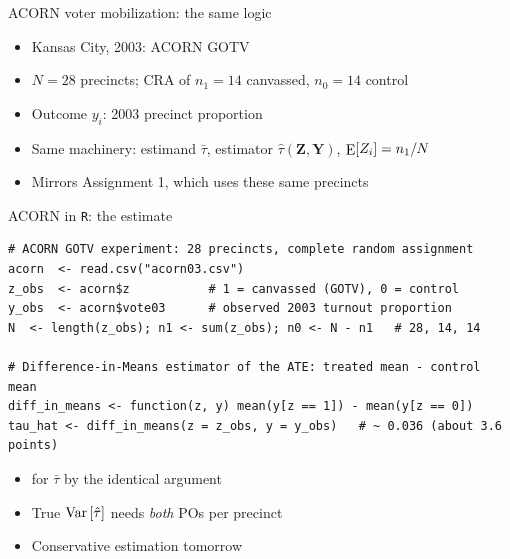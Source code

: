 \documentclass[table, xcolor = {dvipsnames}, 9pt]{beamer}
\theoremstyle{plain}
\newcommand{\mh}[1]{{\color{magenta}{#1}}}
\DeclareMathOperator{\E}{\rm{E}}
\DeclareMathOperator{\Var}{\rm{Var}}
\begin{document}
\begin{frame}[t]{ACORN voter mobilization: the same logic}
\vfill
\begin{itemize} \vfill
\item Kansas City, 2003: ACORN \mh{door-to-door} GOTV \citep{arceneaux2005} \vfill
\item $N = 28$ precincts; CRA of $n_1 = 14$ canvassed, $n_0 = 14$ control \vfill
\item Outcome $y_i$: 2003 precinct \mh{turnout} proportion \vfill
\item Same machinery: estimand $\bar{\tau}$, estimator $\hat{\tau}\left(\bm{Z}, \bm{Y}\right)$, $\E[Z_i] = n_1/N$ \vfill
\item Mirrors Assignment 1, which uses these same precincts \vfill
\end{itemize} \vfill
\end{frame}
\begin{frame}[fragile]{ACORN in \texttt{R}: the estimate}
\begin{lstlisting}[style=Rstyle, basicstyle=\ttfamily\tiny, frame=single]
# ACORN GOTV experiment: 28 precincts, complete random assignment
acorn  <- read.csv("acorn03.csv")
z_obs  <- acorn$z           # 1 = canvassed (GOTV), 0 = control
y_obs  <- acorn$vote03      # observed 2003 turnout proportion
N  <- length(z_obs); n1 <- sum(z_obs); n0 <- N - n1   # 28, 14, 14

# Difference-in-Means estimator of the ATE: treated mean - control mean
diff_in_means <- function(z, y) mean(y[z == 1]) - mean(y[z == 0])
tau_hat <- diff_in_means(z = z_obs, y = y_obs)   # ~ 0.036 (about 3.6 points)
\end{lstlisting}
\begin{itemize} \vfill
\item \mh{Unbiased} for $\bar{\tau}$ by the identical argument \vfill
\item True $\Var\left[\hat{\tau}\right]$ needs \emph{both} POs per precinct \vfill
\item[] Conservative estimation tomorrow \vfill
\end{itemize}
\end{frame}
\end{document}
